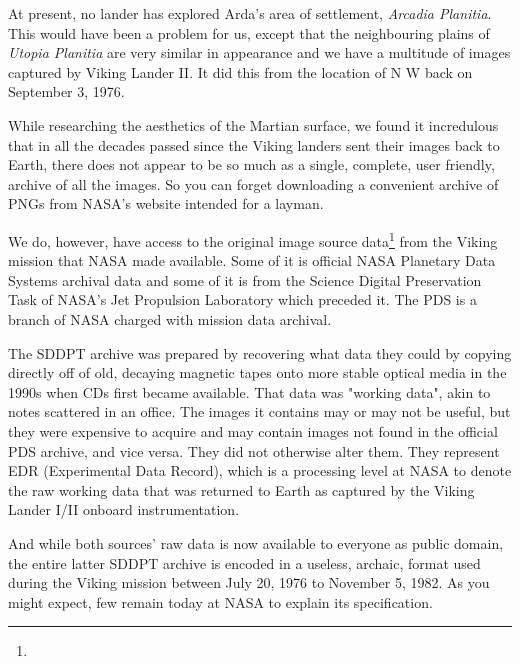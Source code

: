 At present, no lander has explored Arda's area of settlement, {\it Arcadia Planitia}. This would have been a problem for us, except that the neighbouring plains of {\it Utopia Planitia} are very similar in appearance and we have a multitude of images captured by Viking Lander II. It did this from the location of N W back on September 3, 1976.

    {}


While researching the aesthetics of the Martian surface, we found it incredulous that in all the decades passed since the Viking landers sent their images back to Earth, there does not appear to be so much as a single, complete, user friendly, archive of all the images. So you can forget downloading a convenient archive of PNGs from NASA's website intended for a layman.

We do, however, have access to the original image source data\footnote{} from the Viking mission that NASA made available. Some of it is official NASA Planetary Data Systems archival data and some of it is from the Science Digital Preservation Task of NASA's Jet Propulsion Laboratory which preceded it. The PDS is a branch of NASA charged with mission data archival.

The SDDPT archive was prepared by recovering what data they could by copying directly off of old, decaying magnetic tapes onto more stable optical media in the 1990s when CDs first became available. That data was "working data", akin to notes scattered in an office. The images it contains may or may not be useful, but they were expensive to acquire and may contain images not found in the official PDS archive, and vice versa. They did not otherwise alter them. They represent EDR (Experimental Data Record), which is a processing level at NASA to denote the raw working data that was returned to Earth as captured by the Viking Lander I/II onboard instrumentation.

And while both sources' raw data is now available to everyone as public domain, the entire latter SDDPT archive is encoded in a useless, archaic, format used during the Viking mission between July 20, 1976 to November 5, 1982. As you might expect, few remain today at NASA to explain its specification.

